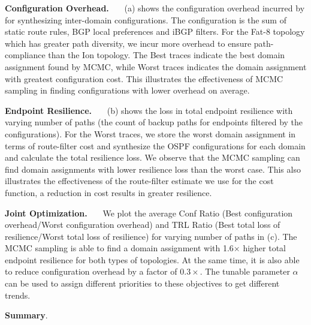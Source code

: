 \noindent\textbf{Configuration Overhead.}~~~
(a) shows the configuration overhead incurred by
\name for synthesizing inter-domain configurations. The configuration
is the sum of static route rules, BGP local preferences and iBGP filters. 
For the Fat-8 topology which has greater path diversity, we incur more 
overhead to ensure path-compliance than the Ion topology. 
The Best traces indicate the best domain assignment found by MCMC, while 
Worst traces indicates the domain assignment with greatest 
configuration cost. 
This illustrates
the effectiveness of MCMC sampling in finding configurations with lower overhead on average.

\noindent\textbf{Endpoint Resilience.}~~~
(b) shows the loss in total endpoint resilience
with varying number of paths (the count 
of backup paths for endpoints filtered by the configurations). For the
Worst traces, we store the worst domain assignment in terms of route-filter
cost and synthesize the OSPF configurations for each domain and calculate
the total resilience loss. We observe that 
the MCMC sampling can find domain 
assignments with lower resilience loss than the worst case. This 
also illustrates the effectiveness of the route-filter estimate we use
for the cost function, a reduction in cost results in greater resilience. 

\noindent\textbf{Joint Optimization.}~~~
We plot the average Conf Ratio 
(Best configuration overhead/Worst configuration overhead) and TRL
Ratio (Best total loss of resilience/Worst total loss of resilience)
for varying number of paths in (c). The MCMC
sampling is able to find a domain assignment
with 1.6$\times$ higher total endpoint resilience for both types
of topologies. At the same time, it is also able to reduce configuration
overhead by a factor of $0.3\times$. The tunable parameter $\alpha$ 
can be used to assign different priorities to these objectives to get
different trends. 

\noindent\textbf{Summary}.
